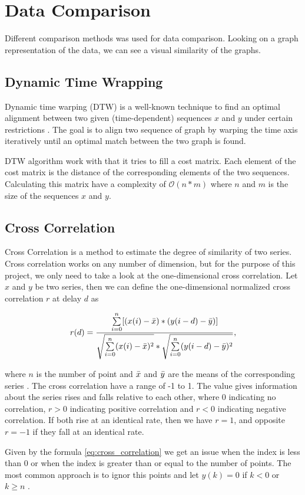 \section{Data Comparison}
\label{sec:data_comparison}
Different comparison methods was used for data comparison. Looking on a graph representation of the data, we can see a visual similarity of the graphs.

\subsection{Dynamic Time Wrapping}
Dynamic time warping (DTW) is a well-known technique to find an optimal
alignment between two given (time-dependent) sequences $x$ and $y$ under certain restrictions \cite{muller2007dynamic}. The goal is to align two sequence of graph by warping the time axis iteratively until an optimal match between the two graph is found.

DTW algorithm work with that it tries to fill a cost matrix. Each element of the cost matrix is the distance of the corresponding elements of the two sequences. Calculating this matrix have a complexity of $\mathcal{O}(n*m)$ where $n$ and $m$ is the size of the sequences $x$ and $y$. 

\subsection{Cross Correlation}
\label{subsec:cross_correlation}
Cross Correlation is a method to estimate the degree of similarity of two series. Cross correlation works on any number of dimension, but for the purpose of this project, we only need to take a look at the one-dimensional cross correlation. Let $x$ and $y$ be two series, then we can define the one-dimensional normalized cross correlation $r$ at delay $d$ as	

\begin{equation}
\label{eq:cross_correlation}
    r(d) = \frac{\sum\limits_{i=0}\limits^{n} [(x(i) - \bar{x}) * (y(i-d) - \bar{y})]}{\sqrt{\sum\limits_{i=0}\limits^{n} (x(i) - \bar{x})^{2}} * \sqrt{\sum\limits_{i=0}\limits^{n} (y(i-d) - \bar{y})^{2}}},
\end{equation}

where $n$ is the number of point and $\bar{x}$ and $\bar{y}$ are the means of the corresponding series \cite{cross_correlation_theory}. The cross correlation have a range of -1 to 1. The value gives information about the series rises and falls relative to each other, where 0 indicating no correlation, $r > 0$ indicating positive correlation and $r < 0$ indicating negative correlation. If both rise at an identical rate, then we have $r = 1$, and opposite $r = -1$ if they fall at an identical rate. 

Given by the formula \ref{eq:cross_correlation} we get an issue when the index is less than 0 or when the index is greater than or equal to the number of points. The most common approach is to ignor this points and let $y(k) = 0$ if $k < 0$ or $k \geq n$ \cite{cross_correlation_code}.